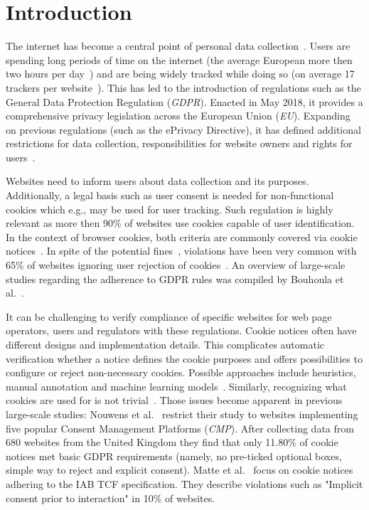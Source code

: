 \chapter{Introduction} \label{chap:introduction}

The internet has become a central point of personal data collection~\cite{kretschmer2021cookie}.
Users are spending long periods of time on the internet (the average European more then two hours per day~\cite{kretschmer2021cookie}) and are being widely tracked while doing so (on average 17 trackers per website~\cite{kretschmer2021cookie}).
This has led to the introduction of regulations such as the General Data Protection Regulation (\emph{GDPR}). 
Enacted in May 2018, it provides a comprehensive privacy legislation across the European Union (\emph{EU}).
Expanding on previous regulations (such as the ePrivacy Directive), it has defined additional restrictions for data collection, responsibilities for website owners and rights for users~\cite{kretschmer2021cookie}.

Websites need to inform users about data collection and its purposes.
Additionally, a legal basis such as user consent is needed for non-functional cookies which e.g., may be used for user tracking.
Such regulation is highly relevant as more then 90\% of websites use cookies capable of user identification.
In the context of browser cookies, both criteria are commonly covered via cookie notices~\cite{bouhoula2023automated}.
In spite of the potential fines~\cite{sanchez_rola2019can}, violations have been very common with 65\% of websites ignoring user rejection of cookies~\cite{bouhoula2023automated}.
An overview of large-scale studies regarding the adherence to GDPR rules was compiled by Bouhoula et al.~\cite{bouhoula2023automated}.

It can be challenging to verify compliance of specific websites for web page operators, users and regulators with these regulations.
Cookie notices often have different designs and implementation details.
This complicates automatic verification whether a notice defines the cookie purposes and offers possibilities to configure or reject non-necessary cookies.
Possible approaches include heuristics, manual annotation and machine learning models~\cite{kretschmer2021cookie, bouhoula2023automated}.
Similarly, recognizing what cookies are used for is not trivial~\cite{sanchez_rola2019can, bollinger2022automating}.
Those issues become apparent in previous large-scale studies:
Nouwens et al.~\cite{nouwens2020dark} restrict their study to websites implementing five popular Consent Management Platforms (\emph{CMP}).
After collecting data from 680 websites from the United Kingdom they find that only 11.80\% of cookie notices met basic GDPR requirements (namely, no pre-ticked optional boxes, simple way to reject and explicit consent).
Matte et al.~\cite{matte2020cookiebannersrespectchoice} focus on cookie notices adhering to the IAB TCF specification.
They describe violations such as "Implicit consent prior to interaction" in 10\% of websites.

